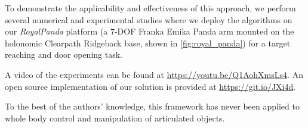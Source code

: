 To demonstrate the applicability and effectiveness of this approach, we perform several numerical and experimental studies where we deploy the algorithms on our \textit{RoyalPanda} platform (a 7-DOF Franka Emika Panda arm mounted on the holonomic Clearpath Ridgeback base, shown in \fig\ref{fig:royal_panda}) for a target reaching and door opening task. {{A video of the experiments can be found at \url{https://youtu.be/Q1AohXmsLs4}}. An open source implementation of our solution is provided at \url{https://git.io/JXi4d}.

To the best of the authors' knowledge, this framework has never been applied to whole body control and manipulation of articulated objects.

 



}
